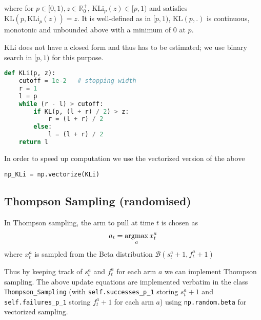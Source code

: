where for $p\in[0,1), z\in\mathbb{R}_0^+$, $\text{KLi}_p(z)\in[p, 1)$ and satisfies $\text{KL}(p, \text{KLi}_p(z)) = z$. It is well-defined as in $[p, 1)$, $\text{KL}(p,.)$ is continuous, monotonic and unbounded above with a minimum of 0 at $p$.

$\text{KLi}$ does not have a closed form and thus has to be estimated; we use binary search in $[p, 1)$ for this purpose.

\begin{lstlisting}[language=python]
def KLi(p, z):
    cutoff = 1e-2   # stopping width
    r = 1
    l = p
    while (r - l) > cutoff:
        if KL(p, (l + r) / 2) > z:
            r = (l + r) / 2
        else:
            l = (l + r) / 2
    return l
\end{lstlisting}

In order to speed up computation we use the vectorized version of the above
\begin{lstlisting}[language=python]
np_KLi = np.vectorize(KLi)
\end{lstlisting}

\subsection{Thompson Sampling (randomised)}
In Thompson sampling, the arm to pull at time $t$ is chosen as
\begin{align*}
    a_t = \operatorname*{argmax}_{a} x_t^a
\end{align*}
where $x_t^a$ is sampled from the Beta distribution $\mathcal{B}(s_t^a + 1, f_t^a + 1)$

Thus by keeping track of $s_t^a$ and $f_t^a$ for each arm $a$ we can implement Thompson sampling. The above update equations are implemented verbatim in the class \lstinline{Thompson_Sampling} (with \lstinline{self.successes_p_1} storing $s_t^a + 1$  and \lstinline{self.failures_p_1} storing $f_t^a + 1$ for each arm $a$) using \lstinline{np.random.beta} for vectorized sampling.
